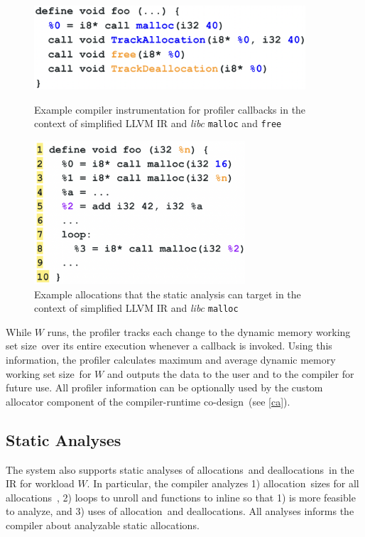 \documentclass{article}
\def\crcd{compiler-runtime co-design}
\def\ALL{allocation}
\def\ALLS{allocations}
\def\DALLS{deallocations}
\def\DWS{dynamic memory working set size}
\begin{document}
\begin{figure}
    \centering
    \begin{minipage}{0.45\textwidth}
        \centering
        \includegraphics[width=0.9\textwidth]{figs/pins.png} 
        \caption{Example compiler instrumentation for profiler callbacks in the 
        context of simplified LLVM IR and \textit{libc} \texttt{malloc}
        and \texttt{free}}  
	    \label{fig:pins}
    \end{minipage}\hfill
    \begin{minipage}{0.45\textwidth}
        \centering
        \includegraphics[width=0.70\textwidth]{figs/sizes.png} 
        \caption{Example allocations that the static analysis can target in the 
        context of simplified LLVM IR and \textit{libc} \texttt{malloc}}  
	    \label{fig:sizes}
    \end{minipage}\hfill
\end{figure}

While $W$ runs, the profiler tracks each change to the \DWS\ over its entire execution 
whenever a callback is invoked. Using this information, the profiler calculates maximum 
and average \DWS\ for $W$ and outputs the data to the user and to the compiler for future 
use. All profiler information can be optionally used by the custom allocator component of
the \crcd\ (see \ref{ca}).

\subsection{Static Analyses} \label{sa}
The system also supports static analyses of \ALLS\ and \DALLS\ in the IR for workload $W$. 
In particular, the compiler analyzes 1) \ALL\ sizes for all \ALLS\ , 2) loops to unroll 
and functions to inline so that 1) is more feasible to analyze, and 3) uses of \ALL\ and 
\DALLS . All analyses informs the compiler about analyzable static allocations. 
\end{document}
